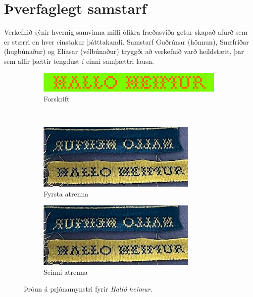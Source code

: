 \documentclass[a4paper,12pt]{article}
\begin{document}
\section{Þverfaglegt samstarf}
Verkefnið sýnir hvernig samvinna milli ólíkra fræðasviða getur skapað afurð sem er
stærri en hver einstakur þátttakandi. Samstarf Guðrúnar (hönnun), Snæfríðar (hugbúnaður)
og Elíasar (vélbúnaður) tryggði að verkefnið varð heildstætt, þar sem allir þættir
tengdust í einni samþættri lausn.


\begin{figure}
    \centering
    \begin{subfigure}[b]{\textwidth}
        \includegraphics[width=\linewidth, clip=true, trim=0 5mm 0 0]{figs/hallo_heimur_forskrift.png}
        \caption{Forskrift}
    \end{subfigure}
    \\
    \begin{subfigure}[b]{0.48\textwidth}
        \includegraphics[width=\linewidth, clip=true, trim=0 5mm 0 0]{figs/hallo_heimur_prjon.png}
        \caption{Fyrsta atrenna}
    \end{subfigure}
    \hfill
    \begin{subfigure}[b]{0.48\textwidth}
        \includegraphics[width=\linewidth, clip=true, trim=0 0 0 5mm]{figs/hallo_heimur_prjon.png}
        \caption{Seinni atrenna}
    \end{subfigure}
    \caption{Þróun á prjónamynstri fyrir \textit{Halló heimur}.}
    \label{fig:hallo_heimur}
\end{figure}
\end{document}
